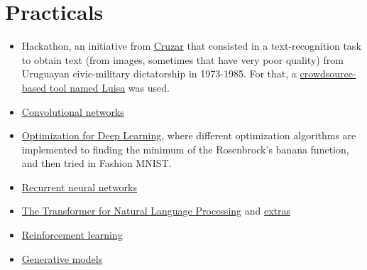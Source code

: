 \documentclass[12pt, english]{article}
\begin{document}
\section{Practicals}

\begin{itemize}
  \item Hackathon, an initiative from \href{http://cruzar.uy/}{Cruzar} that consisted in a text-recognition task to obtain text (from images, sometimes that have very poor quality) from Uruguayan civic-military dictatorship in 1973-1985. For that, a \href{https://www.fing.edu.uy/mh/luisa/}{crowdsource-based tool named Luisa} was used.
  \item \href{https://colab.research.google.com/github/khipu-ai/practicals-2019/blob/master/1a_conv_nets.ipynb}{Convolutional networks}
  \item \href{https://colab.research.google.com/github/khipu-ai/practicals-2019/blob/master/1a_conv_nets.ipynb}{Optimization for Deep Learning}, where different optimization algorithms are implemented to finding the minimum of the Rosenbrock's banana function, and then tried in Fashion MNIST.
  \item \href{https://colab.research.google.com/github/khipu-ai/practicals-2019/blob/master/2a_recurrent_nets.ipynb}{Recurrent neural networks}
  \item \href{https://colab.research.google.com/github/khipu-ai/practicals-2019/blob/master/2b_nlp_transformer.ipynb}{The Transformer for Natural Language Processing} and \href{https://colab.research.google.com/github/khipu-ai/practicals-2019/blob/master/2b_nlp_transformer_extra.ipynb}{extras}
  \item \href{https://colab.research.google.com/github/khipu-ai/practicals-2019/blob/master/3a_reinforcement_learning.ipynb}{Reinforcement learning}
  \item \href{https://colab.research.google.com/github/khipu-ai/practicals-2019/blob/master/3b_generative_models.ipynb}{Generative models}
\end{itemize}
\end{document}
